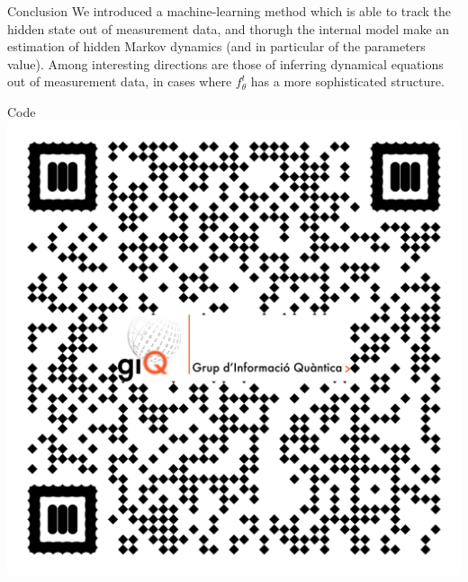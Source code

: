 \documentclass[xcolor={table}]{beamer}
\begin{document}
\begin{frame}[fragile=singleslide,t]
\begin{columns}[onlytextwidth,T]
\begin{column}{.47\textwidth}


\begin{block}{Conclusion}
  We introduced a machine-learning method which is able to track the hidden state out of measurement data, and thorugh the internal model make an estimation of hidden Markov dynamics (and in particular of the parameters value). Among interesting directions are those of inferring dynamical equations out of measurement data, in cases where $f_\theta^t$ has a more sophisticated structure.
  \end{block}


\begin{block}{Code}
\includegraphics[width=.15\textwidth]{figures_poster/qr_repo.pdf}
\end{block}


\printbibliography

\end{column}
\end{columns}


\end{frame}
\end{document}
